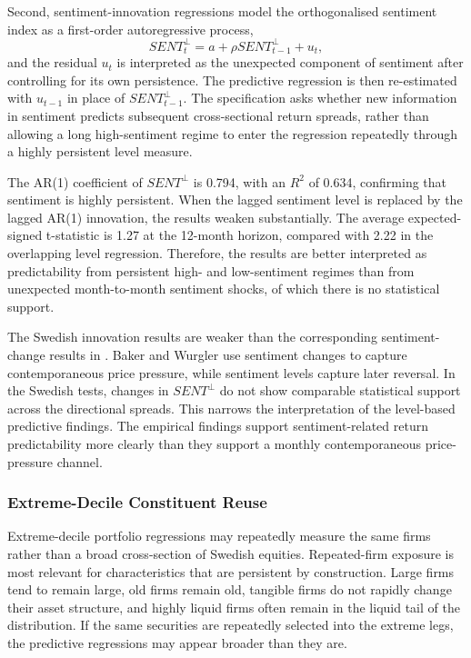 \documentclass[11pt]{article}
\newcommand{\var}[1]{\ensuremath{#1}}
\begin{document}
Second, sentiment-innovation regressions model the orthogonalised sentiment index as a first-order autoregressive process,
\begin{equation}
    SENT^{\perp}_{t} = a + \rho SENT^{\perp}_{t-1} + u_t,
\end{equation}
and the residual \var{u_t} is interpreted as the unexpected component of sentiment after controlling for its own persistence. The predictive regression is then re-estimated with \var{u_{t-1}} in place of \var{SENT^{\perp}_{t-1}}. The specification asks whether new information in sentiment predicts subsequent cross-sectional return spreads, rather than allowing a long high-sentiment regime to enter the regression repeatedly through a highly persistent level measure.

The AR(1) coefficient of \var{SENT^{\perp}} is 0.794, with an \var{R^2} of 0.634, confirming that sentiment is highly persistent. When the lagged sentiment level is replaced by the lagged AR(1) innovation, the results weaken substantially. The average expected-signed t-statistic is 1.27 at the 12-month horizon, compared with 2.22 in the overlapping level regression. Therefore, the results are better interpreted as predictability from persistent high- and low-sentiment regimes than from unexpected month-to-month sentiment shocks, of which there is no statistical support.

The Swedish innovation results are weaker than the corresponding sentiment-change results in \citet{baker2007}. Baker and Wurgler use sentiment changes to capture contemporaneous price pressure, while sentiment levels capture later reversal. In the Swedish tests, changes in \var{SENT^{\perp}} do not show comparable statistical support across the directional spreads. This narrows the interpretation of the level-based predictive findings. The empirical findings support sentiment-related return predictability more clearly than they support a monthly contemporaneous price-pressure channel.

\subsubsection{Extreme-Decile Constituent Reuse}
Extreme-decile portfolio regressions may repeatedly measure the same firms rather than a broad cross-section of Swedish equities. Repeated-firm exposure is most relevant for characteristics that are persistent by construction. Large firms tend to remain large, old firms remain old, tangible firms do not rapidly change their asset structure, and highly liquid firms often remain in the liquid tail of the distribution. If the same securities are repeatedly selected into the extreme legs, the predictive regressions may appear broader than they are.
\end{document}
